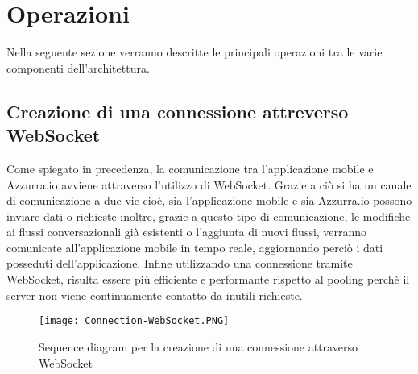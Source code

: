 \section{Operazioni}
Nella seguente sezione verranno descritte le principali operazioni tra le varie componenti dell'architettura.
\subsection{Creazione di una connessione attreverso WebSocket}
Come spiegato in precedenza, la comunicazione tra l'applicazione mobile e Azzurra.io avviene attraverso l'utilizzo di WebSocket. Grazie a ciò si ha un canale di comunicazione a due vie cioè, sia l'applicazione mobile e sia Azzurra.io possono inviare dati o richieste inoltre, grazie a questo tipo di comunicazione, le modifiche ai flussi conversazionali già esistenti o l'aggiunta di nuovi flussi, verranno comunicate all'applicazione mobile in tempo reale, aggiornando perciò i dati posseduti dell'applicazione. Infine utilizzando una connessione tramite WebSocket, risulta essere più efficiente e performante rispetto al pooling perchè il server non viene continuamente contatto da inutili richieste.
\begin{figure}[h]
	\begin{center}
		\texttt{[image: Connection-WebSocket.PNG]}
		\caption{Sequence diagram per la creazione di una connessione attraverso WebSocket}\label{fig:websocket}
	\end{center}
\end{figure}


